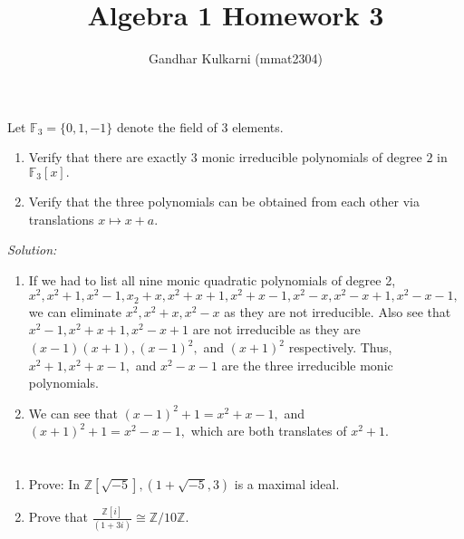 \documentclass{article}
\title{Algebra 1 Homework 3} %
\author{Gandhar Kulkarni (mmat2304)} %
\date{} %
\begin{document}
\maketitle %


\section{} %
Let $\mathbb{F}_3=\{0,1,-1\}$ denote the field of $3$ elements.
\begin{enumerate}
	\item Verify that there are exactly $3$ monic irreducible polynomials of degree $2$ in $\mathbb{F}_3[x].$
	\item Verify that the three polynomials can be obtained from each other via translations $x \mapsto x+a.$
\end{enumerate}
\emph{Solution:} 
\begin{enumerate}
	\item If we had to list all nine monic quadratic polynomials of degree 2, $x^2,x^2+1,x^2-1,x_2+x,x^2+x+1,x^2+x-1,x^2-x,x^2-x+1,x^2-x-1,$
	we can eliminate $x^2,x^2+x,x^2-x$ as they are not irreducible. Also see that $x^2-1,x^2+x+1,x^2-x+1$ are not 
	irreducible as they are $(x-1)(x+1), (x-1)^2,$ and $(x+1)^2$  respectively. Thus, $x^2+1,x^2+x-1,$ and $x^2-x-1$
	are the three irreducible monic polynomials.

	\item We can see that $ (x-1)^2+1=x^2+x-1,$ and $(x+1)^2+1=x^2-x-1,$ which are both translates of $x^2+1.$
\end{enumerate}

\section{} %
\begin{enumerate}
	\item Prove: In $\mathbb{Z}[\sqrt{-5}], (1+\sqrt{-5},3)$ is a maximal ideal.
	\item Prove that $\frac{\mathbb{Z}[i]}{(1+3i)}\cong \mathbb{Z}/10\mathbb{Z}.$
\end{enumerate}
\end{document}
